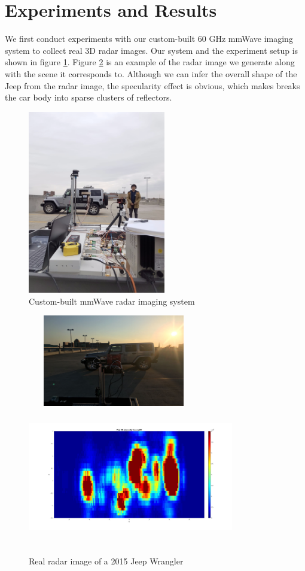 \section{ Experiments and Results} \label{experiment}
We first conduct experiments with our custom-built 60 GHz mmWave imaging system to collect real 3D radar images. Our system and the experiment setup is shown in figure \ref{fig_exp}. Figure \ref{fig_real} is an example of the radar image we generate along with the scene it corresponds to. Although we can infer the overall shape of the Jeep from the radar image, the specularity effect is obvious, which makes breaks the car body into sparse clusters of reflectors.

\begin{figure} 
	\centering
	\includegraphics[width=6cm,height=8cm]{./figure/exp_2.png}
	\caption{Custom-built mmWave radar imaging system}
	\label{fig_exp}
\end{figure} 
 
\begin{figure}
	\centering
	\includegraphics[width=7.5cm,height=4cm]{./figure/exp_1.png}\\
	\includegraphics[width=9cm,height=6cm]{./figure/exp_1_img.jpg}
	\caption{Real radar image of a 2015 Jeep Wrangler}
	\label{fig_real}
\end{figure} 

